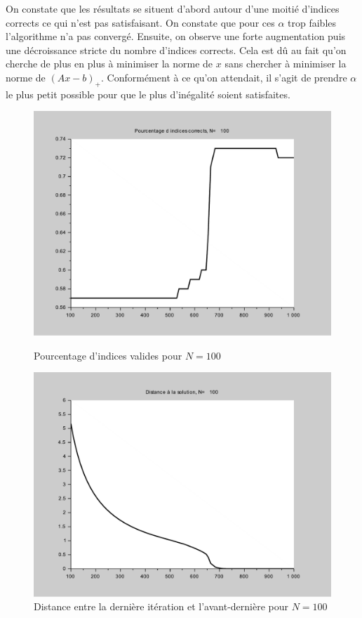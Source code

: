 \documentclass[10pt,a4paper]{article}
\begin{document}
On constate que les résultats se situent d'abord autour d'une moitié d'indices corrects ce qui n'est pas satisfaisant.
On constate que pour ces $\alpha$ trop faibles l'algorithme n'a pas convergé.
Ensuite, on observe une forte augmentation puis une décroissance stricte du nombre d'indices corrects.
Cela est dû au fait qu'on cherche de plus en plus à minimiser la norme de $x$ sans chercher à minimiser la norme de $(Ax-b)_+$.
Conformément à ce qu'on attendait, il s'agit de prendre $\alpha$ le plus petit possible pour que le plus d'inégalité soient satisfaites.
\begin{figure}[H]
\centering
\begin{minipage}[b]{.46\linewidth}
\centering
\includegraphics[scale=0.3]{percent_alpha1_100.pdf}
\caption{Pourcentage d'indices valides pour $N=100$}
\end{minipage}
\begin{minipage}[b]{.46\linewidth}
\centering
\includegraphics[scale=0.3]{dist_alpha1_100.pdf}
\caption{Distance entre la dernière itération et l'avant-dernière pour $N=100$}
\end{minipage}
\end{figure}
\end{document}
